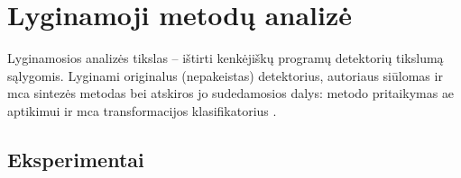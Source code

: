 \section{Lyginamoji metodų analizė}\label{sec:experiments}

Lyginamosios analizės tikslas -- ištirti kenkėjiškų programų detektorių tikslumą  sąlygomis. Lyginami originalus (nepakeistas) detektorius, autoriaus siūlomas \LIME ir \gls{mca} sintezės metodas  bei atskiros jo sudedamosios dalys: \LIME metodo pritaikymas \gls{ae} aptikimui  ir \gls{mca} transformacijos klasifikatorius .



\clearpage
\subsection{Eksperimentai}

\clearpage

\clearpage

\clearpage
